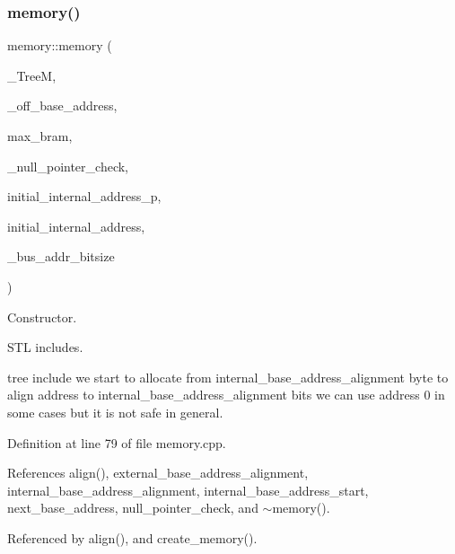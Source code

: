 \subsubsection{\texorpdfstring{memory()}{memory()}}
{\footnotesize\ttfamily memory\+::memory (\begin{DoxyParamCaption}\item[{const \hyperlink{tree__manager_8hpp_a96ff150c071ce11a9a7a1e40590f205e}{tree\+\_\+manager\+Ref}}]{\+\_\+\+TreeM,  }\item[{unsigned int}]{\+\_\+off\+\_\+base\+\_\+address,  }\item[{unsigned int}]{max\+\_\+bram,  }\item[{bool}]{\+\_\+null\+\_\+pointer\+\_\+check,  }\item[{bool}]{initial\+\_\+internal\+\_\+address\+\_\+p,  }\item[{unsigned int}]{initial\+\_\+internal\+\_\+address,  }\item[{const unsigned \&}]{\+\_\+bus\+\_\+addr\+\_\+bitsize }\end{DoxyParamCaption})}



Constructor. 

S\+TL includes.

tree include we start to allocate from internal\+\_\+base\+\_\+address\+\_\+alignment byte to align address to internal\+\_\+base\+\_\+address\+\_\+alignment bits we can use address 0 in some cases but it is not safe in general. 

Definition at line 79 of file memory.\+cpp.



References align(), external\+\_\+base\+\_\+address\+\_\+alignment, internal\+\_\+base\+\_\+address\+\_\+alignment, internal\+\_\+base\+\_\+address\+\_\+start, next\+\_\+base\+\_\+address, null\+\_\+pointer\+\_\+check, and $\sim$memory().



Referenced by align(), and create\+\_\+memory().

